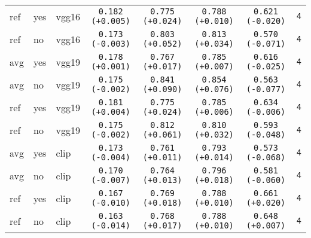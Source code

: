\begin{tabular}{|l|l|l|c|c|c|c|c|}
ref & yes & vgg16 & \texttt{0.182 {\color{green}(+0.005)}} & \texttt{0.775 {\color{red}(+0.024)}} & \texttt{0.788 {\color{red}(+0.010)}} & \texttt{0.621 {\color{red}(-0.020)}} & \texttt{4} \\
ref & no & vgg16 & \texttt{0.173 {\color{red}(-0.003)}} & \texttt{0.803 {\color{red}(+0.052)}} & \texttt{0.813 {\color{red}(+0.034)}} & \texttt{0.570 {\color{red}(-0.071)}} & \texttt{4} \\
\hline
avg & yes & vgg19 & \texttt{0.178 {\color{green}(+0.001)}} & \texttt{0.767 {\color{red}(+0.017)}} & \texttt{0.785 {\color{red}(+0.007)}} & \texttt{0.616 {\color{red}(-0.025)}} & \texttt{4} \\
avg & no & vgg19 & \texttt{0.175 {\color{red}(-0.002)}} & \texttt{0.841 {\color{red}(+0.090)}} & \texttt{0.854 {\color{red}(+0.076)}} & \texttt{0.563 {\color{red}(-0.077)}} & \texttt{4} \\
ref & yes & vgg19 & \texttt{0.181 {\color{green}(+0.004)}} & \texttt{0.775 {\color{red}(+0.024)}} & \texttt{0.785 {\color{red}(+0.006)}} & \texttt{0.634 {\color{red}(-0.006)}} & \texttt{4} \\
ref & no & vgg19 & \texttt{0.175 {\color{red}(-0.002)}} & \texttt{0.812 {\color{red}(+0.061)}} & \texttt{0.810 {\color{red}(+0.032)}} & \texttt{0.593 {\color{red}(-0.048)}} & \texttt{4} \\
\hline
avg & yes & clip & \texttt{0.173 {\color{red}(-0.004)}} & \texttt{0.761 {\color{red}(+0.011)}} & \texttt{0.793 {\color{red}(+0.014)}} & \texttt{0.573 {\color{red}(-0.068)}} & \texttt{4} \\
avg & no & clip & \texttt{0.170 {\color{red}(-0.007)}} & \texttt{0.764 {\color{red}(+0.013)}} & \texttt{0.796 {\color{red}(+0.018)}} & \texttt{0.581 {\color{red}(-0.060)}} & \texttt{4} \\
ref & yes & clip & \texttt{0.167 {\color{red}(-0.010)}} & \texttt{0.769 {\color{red}(+0.018)}} & \texttt{0.788 {\color{red}(+0.010)}} & \texttt{0.661 {\color{green}(+0.020)}} & \texttt{4} \\
ref & no & clip & \texttt{0.163 {\color{red}(-0.014)}} & \texttt{0.768 {\color{red}(+0.017)}} & \texttt{0.788 {\color{red}(+0.010)}} & \texttt{0.648 {\color{green}(+0.007)}} & \texttt{4} \\
\hline
\end{tabular}
